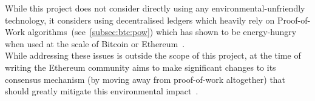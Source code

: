 While this project does not consider directly using any environmental-unfriendly technology, it
considers using decentralised ledgers which heavily rely on Proof-of-Work
algorithms~(see~\ref{subsec:btc:pow}) which has shown to be energy-hungry when used at the scale of
Bitcoin or Ethereum~\cite{GOODKIND2020101281}.\\

While addressing these issues is outside the scope of this project, at the time of writing the
Ethereum community aims to make significant changes to its consensus mechanism (by moving away from
proof-of-work altogether) that should greatly mitigate this environmental impact~\cite{eth2Vision}.

